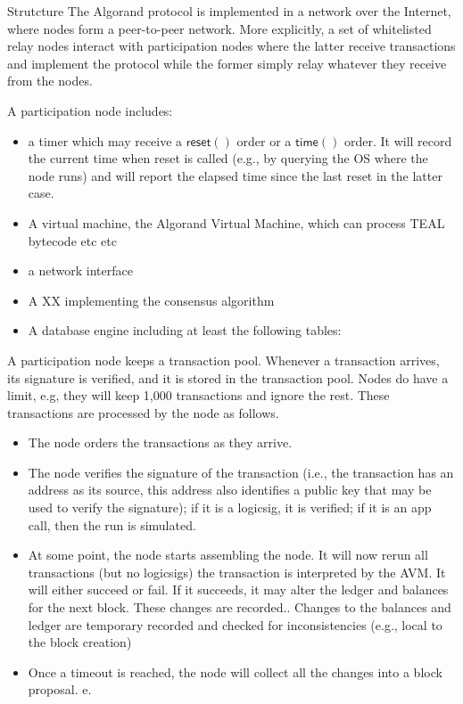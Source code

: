 \documentclass[10pt,a4paper]{article}
\begin{document}
\begin{section}{Strutcture}
The Algorand protocol is implemented in a network over the Internet, where nodes 
form a peer-to-peer network. More explicitly, a set of whitelisted relay nodes 
interact with participation nodes where the latter receive transactions and
implement the protocol while the former simply relay whatever they receive from
the nodes.

A participation node includes:
\begin{itemize}
    \item a timer which may receive a $\mathsf{reset()}$ order or a $\mathsf{time()}$
order. It will record the current time when reset is called (e.g., by querying
the OS where the node runs) and will report the elapsed time since the last reset
in the latter case.
    \item A virtual machine, the Algorand Virtual Machine, which can process TEAL bytecode
etc etc
    \item a network interface
    \item A XX implementing the consensus algorithm
    \item A database engine including at least the following tables:
\end{itemize}



A participation node keeps a transaction pool. Whenever a transaction arrives, its signature
is verified, and it is stored in the transaction pool. Nodes do have a limit, e.g, they will
keep 1,000 transactions and ignore the rest.
These transactions are processed by the node as follows.
\begin{itemize}
    \item The node orders the transactions as they arrive.
    \item The node verifies the signature of the transaction (i.e., the transaction has an 
    address as its source, this address also identifies a public key that may be used to 
    verify the signature); if it is a logicsig, it is verified; if it is an app call, then
    the run is simulated.
    \item At some point, the node starts assembling the node. It will now rerun all transactions
    (but no logicsigs) the transaction is interpreted by the AVM. It will either succeed or
    fail. If it succeeds, it may alter the ledger and balances for the next block. These 
    changes are recorded.. Changes to the balances and ledger are temporary recorded and
    checked for inconsistencies (e.g., local to the block creation)
    \item Once a timeout is reached, the node will collect all the changes into a block 
    proposal. e.
\end{itemize}


\end{section}
\end{document}
